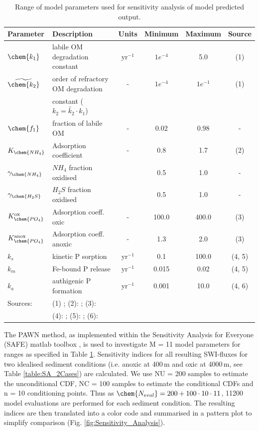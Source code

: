 \documentclass[gmd, manuscript]{copernicus}
\begin{document}
\begin{table}[btp]
\caption{Range of model parameters used for sensitivity analysis of model predicted output.} 
\centering
\begin{tabular}{l l c c c c}
\hline\hline
Parameter & Description & Units & Minimum  & Maximum & Source\\
\hline
$\chem{k_1}$ & labile OM degradation constant & yr$^{-1}$ & $1e^{-4}$ & 5.0 & (1)\\
$\widetilde{\chem{k_2}}$ & order of refractory OM degradation & - & $1e^{-4}$ & $1e^{-1}$ &  (1)\\
 & constant ($k_2 = \widetilde{k_2} \cdot k_1$) & & &  &\\
$\chem{f_1}$ & fraction of labile OM & - & 0.02 & 0.98  & - \\
$K_{\chem{NH_4}}$ & Adsorption coefficient & - & 0.8 & 1.7  & (2) \\
$\gamma_\chem{NH_4}$ & $NH_4$ fraction oxidised &  & 0.5 & 1.0 & - \\
$\gamma_\chem{H_2S}$ &  $H_2S$ fraction oxidised  &  & 0.5 & 1.0 & - \\
$K_\chem{PO_4}^\mathrm{ox}$ & Adsorption coeff. oxic & - & 100.0 & 400.0  & (3) \\
$K_\chem{PO_4}^\mathrm{anox}$ & Adsorption coeff. anoxic & - & 1.3 & 2.0 & (3) \\
$k_{s}$ & kinetic P sorption & yr$^{-1}$  & 0.1 & 100.0 & (4, 5)\\
$k_{m}$ & Fe-bound P release & yr$^{-1}$  & 0.015 & 0.02 & (4, 5)\\
$k_{a}$ & authigenic P formation & yr$^{-1}$  & 0.001 & 10.0 & (4, 6)\\
\hline
Sources: &\multicolumn{5}{l}{(1) \citet{arndt_quantifying_2013}; (2): \citet{cappellen_cycling_1996}; (3): \citet{krom_adsorption_1980}}\\
&\multicolumn{5}{l}{(4): \citet{gypens_simple_2008}; (5): \citet{caroline_p_slomp_key_1996}; (6): \citet{cappellen_mathematical_1988}}
\end{tabular}
\label{table:SA_parameter_ranges}
\end{table}

The PAWN method, as implemented within the Sensitivity Analysis for Everyone (SAFE) matlab toolbox \citep{pianosi_matlab_2015}, is used to investigate M = 11 model parameters for ranges as specified in Table \ref{table:SA_parameter_ranges}. 
Sensitivity indices for all resulting SWI-fluxes for two idealised sediment conditions (i.e. anoxic at 400\,m and oxic at 4000\,m, see Table \ref{table:SA_2Cases}) are calculated. 
We use NU = 200 samples to estimate the unconditional CDF, NC = 100 samples to estimate the conditional CDFs and n = 10 conditioning points. 
Thus as $\chem{N_{eval}}=200+100\cdot10\cdot11$, 11200 model evaluations are performed for each sediment condition. 
The resulting indices are then translated into a color code and summarised in a pattern plot to simplify comparison (Fig. \ref{fig:Sensitivity_Analysis}). 
\end{document}
